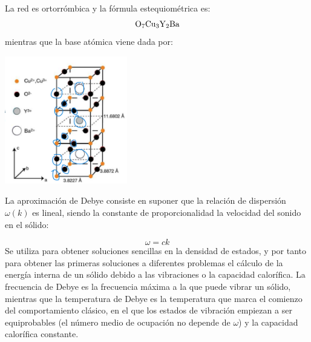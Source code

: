 \begin{solucion}
	La red es ortorrómbica y la fórmula estequiométrica es: 
	\begin{equation*}
		\ce{O_7Cu_3Y_2Ba}
	\end{equation*}
	mientras que la base atómica viene dada por:	
	\begin{center}
		\includegraphics[width=0.4\textwidth]{Imagenes/Enero_2021_01_1.png}
	\end{center}	
\end{solucion}

\begin{solucion}
	La aproximación de Debye consiste en suponer que la relación de dispersión $\omega(k)$ es lineal, siendo la constante de proporcionalidad la velocidad del sonido en el sólido:
	
	\begin{equation*}
		\omega = ck 
	\end{equation*}	
	Se utiliza para obtener soluciones sencillas en la densidad de estados, y por tanto para obtener las primeras soluciones a diferentes problemas el cálculo de la energía interna de un sólido debido a las vibraciones o la capacidad calorífica. La frecuencia de Debye es la frecuencia máxima a la que puede vibrar un sólido, mientras que la temperatura de Debye es la temperatura que marca el comienzo del comportamiento clásico, en el que los estados de vibración empiezan a ser equiprobables (el número medio de ocupación no depende de $\omega$) y la capacidad calorífica constante.
\end{solucion}

